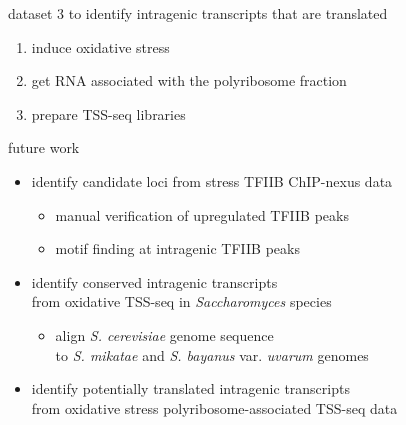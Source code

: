 \documentclass[aspectratio=169]{beamer}
\begin{document}
\begin{frame}{dataset 3}
    to identify intragenic transcripts that are translated
    \vspace{2em}

    \begin{enumerate}
        \item induce oxidative stress
        \item get RNA associated with the polyribosome fraction
        \item prepare TSS-seq libraries
    \end{enumerate}
\end{frame}

\begin{frame}{future work}
    \begin{itemize}
        \item identify candidate loci from stress TFIIB ChIP-nexus data
            \begin{itemize}
                \item manual verification of upregulated TFIIB peaks
                \item motif finding at intragenic TFIIB peaks
            \end{itemize}
        \item identify conserved intragenic transcripts\\from oxidative TSS-seq in \textit{Saccharomyces} species
            \begin{itemize}
                \item align \textit{S. cerevisiae} genome sequence\\to \textit{S. mikatae} and \textit{S. bayanus} var. \textit{uvarum} genomes
            \end{itemize}
        \item identify potentially translated intragenic transcripts\\from oxidative stress polyribosome-associated TSS-seq data
    \end{itemize}
\end{frame}
\end{document}
